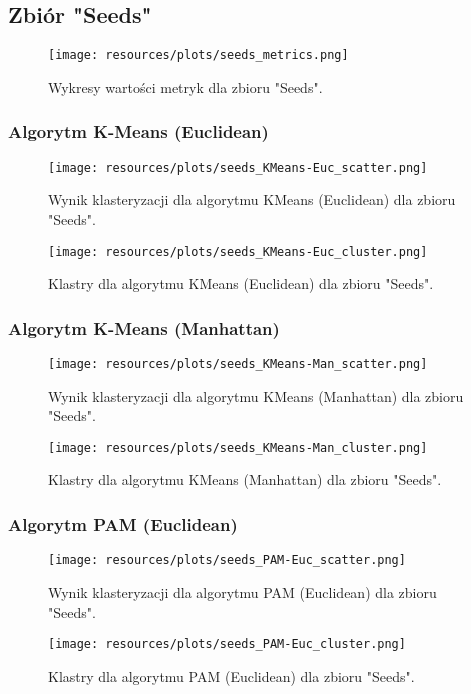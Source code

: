 \subsection{Zbiór "Seeds"}
  \begin{figure}[H]
    \center
    \texttt{[image: resources/plots/seeds\_metrics.png]}
    \caption{Wykresy wartości metryk dla zbioru "Seeds".}
  \end{figure}

  

  \subsubsection{Algorytm K-Means (Euclidean)} 
    \begin{figure}[H]
      \center
      \texttt{[image: resources/plots/seeds\_KMeans-Euc\_scatter.png]}
      \caption{Wynik klasteryzacji dla algorytmu KMeans (Euclidean) dla zbioru "Seeds".}
    \end{figure}
    \begin{figure}[H]
      \center
      \texttt{[image: resources/plots/seeds\_KMeans-Euc\_cluster.png]}
      \caption{Klastry dla algorytmu KMeans (Euclidean) dla zbioru "Seeds".}
    \end{figure}

  \subsubsection{Algorytm K-Means (Manhattan)} 
    \begin{figure}[H]
      \center
      \texttt{[image: resources/plots/seeds\_KMeans-Man\_scatter.png]}
      \caption{Wynik klasteryzacji dla algorytmu KMeans (Manhattan) dla zbioru "Seeds".}
    \end{figure}
    \begin{figure}[H]
      \center
      \texttt{[image: resources/plots/seeds\_KMeans-Man\_cluster.png]}
      \caption{Klastry dla algorytmu KMeans (Manhattan) dla zbioru "Seeds".}
    \end{figure}

  \subsubsection{Algorytm PAM (Euclidean)} 
    \begin{figure}[H]
      \center
      \texttt{[image: resources/plots/seeds\_PAM-Euc\_scatter.png]}
      \caption{Wynik klasteryzacji dla algorytmu PAM (Euclidean) dla zbioru "Seeds".}
    \end{figure}
    \begin{figure}[H]
      \center
      \texttt{[image: resources/plots/seeds\_PAM-Euc\_cluster.png]}
      \caption{Klastry dla algorytmu PAM (Euclidean) dla zbioru "Seeds".}
    \end{figure}

